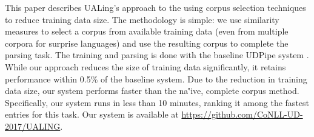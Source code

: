 This paper describes UALing's approach to the \udst{} using corpus selection techniques to reduce training data size.  The methodology is simple: we use similarity measures to select a corpus from available training data (even from multiple corpora for surprise languages) and use the resulting corpus to complete the parsing task.  The training and parsing is done with the baseline UDPipe system \cite{straka-hajic-strakova:2016:LREC}. While our approach reduces the size of training data significantly, it retains performance within 0.5\% of the baseline system. Due to the reduction in training data size, our system performs faster than the na\''ive, complete corpus method.  Specifically, our system runs in less than 10 minutes, ranking it among the fastest entries for this task. Our system is available at \url{https://github.com/CoNLL-UD-2017/UALING}.
